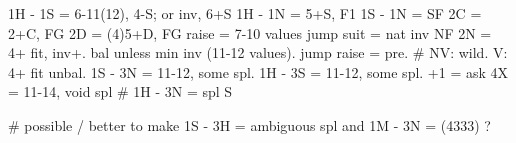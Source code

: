 1H - 1S = 6-11(12), 4-S; or inv, 6+S
1H - 1N = 5+S, F1
1S - 1N = SF
2C = 2+C, FG
2D = (4)5+D, FG
raise = 7-10 values
jump suit = nat inv NF
2N = 4+ fit, inv+. bal unless min inv (11-12 values).
jump raise = pre.  # NV: wild. V: 4+ fit unbal.
1S - 3N = 11-12, some spl. 1H - 3S = 11-12, some spl.
     +1 = ask
4X = 11-14, void spl  # 1H - 3N = spl S

# possible / better to make 1S - 3H = ambiguous spl and 1M - 3N = (4333) ?
